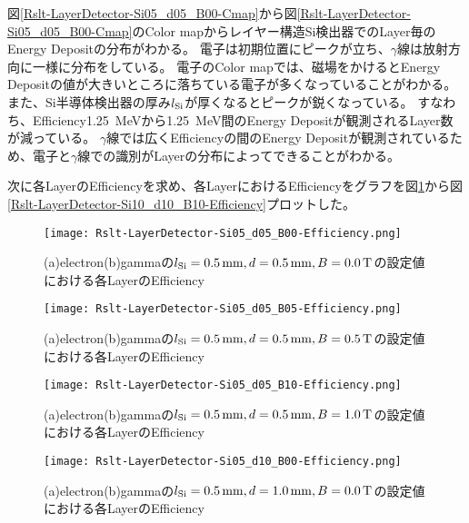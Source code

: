 \documentclass[a4paper,10pt]{jreport}
\begin{document}
図\ref{Rslt-LayerDetector-Si05_d05_B00-Cmap}から図\ref{Rslt-LayerDetector-Si05_d05_B00-Cmap}のColor mapからレイヤー構造Si検出器でのLayer毎のEnergy Depositの分布がわかる。
電子は初期位置にピークが立ち、$\gamma$線は放射方向に一様に分布をしている。
電子のColor mapでは、磁場をかけるとEnergy Depositの値が大きいところに落ちている電子が多くなっていることがわかる。
また、Si半導体検出器の厚み$l_{\rm{Si}}$が厚くなるとピークが鋭くなっている。
すなわち、Efficiency\SI{1.25}{MeV}から\SI{1.25}{MeV}間のEnergy Depositが観測されるLayer数が減っている。
$\gamma$線では広くEfficiencyの間のEnergy Depositが観測されているため、電子と$\gamma$線での識別がLayerの分布によってできることがわかる。

次に各LayerのEfficiencyを求め、各LayerにおけるEfficiencyをグラフを図\ref{Rslt-LayerDetector-Si05_d05_B00-Efficiency}から図\ref{Rslt-LayerDetector-Si10_d10_B10-Efficiency}プロットした。

\begin{figure}[H]
	\center
	\texttt{[image: Rslt-LayerDetector-Si05\_d05\_B00-Efficiency.png]}
	\caption{(a)electron(b)gammaの$l_{\rm{Si}}=\SI{0.5}{mm}, d=\SI{0.5}{mm}, B=\SI{0.0}{T}$の設定値における各LayerのEfficiency}
	\label{Rslt-LayerDetector-Si05_d05_B00-Efficiency}
\end{figure}

\begin{figure}[H]
	\center
	\texttt{[image: Rslt-LayerDetector-Si05\_d05\_B05-Efficiency.png]}
	\caption{(a)electron(b)gammaの$l_{\rm{Si}}=\SI{0.5}{mm}, d=\SI{0.5}{mm}, B=\SI{0.5}{T}$の設定値における各LayerのEfficiency}
	\label{Rslt-LayerDetector-Si05_d05_B05-Efficiency}
\end{figure}

\begin{figure}[H]
	\center
	\texttt{[image: Rslt-LayerDetector-Si05\_d05\_B10-Efficiency.png]}
	\caption{(a)electron(b)gammaの$l_{\rm{Si}}=\SI{0.5}{mm}, d=\SI{0.5}{mm}, B=\SI{1.0}{T}$の設定値における各LayerのEfficiency}
	\label{Rslt-LayerDetector-Si05_d05_B10-Efficiency}
\end{figure}

\begin{figure}[H]
	\center
	\texttt{[image: Rslt-LayerDetector-Si05\_d10\_B00-Efficiency.png]}
	\caption{(a)electron(b)gammaの$l_{\rm{Si}}=\SI{0.5}{mm}, d=\SI{1.0}{mm}, B=\SI{0.0}{T}$の設定値における各LayerのEfficiency}
	\label{Rslt-LayerDetector-Si05_d10_B00-Efficiency}
\end{figure}
\end{document}
